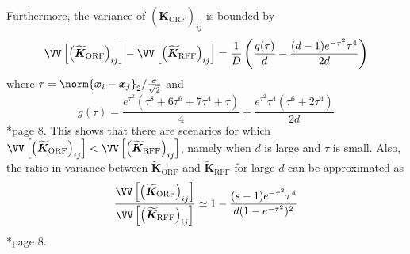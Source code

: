 Furthermore, the variance of $\left( \bm{\widetilde{K}}_{\text{ORF}} \right)_{ij}$ is bounded by
\[
    \VV \left[ \left( \bm{\widetilde{K}}_{\text{ORF}} \right)_{ij} \right] - \VV \left[ \left( \bm{\widetilde{K}}_{\text{RFF}} \right)_{ij} \right] = \frac{1}{D} \left( \frac{g (\tau)}{d} - \frac{(d-1)e^{-\tau^2}\tau^4}{2d} \right)
\]
where $\tau = \norm{\bm{x}_i - \bm{x}_j}_2 / \frac{\sigma}{\sqrt{2}}$ and
\[
    g (\tau) = \frac{e^{\tau^2} \left( \tau^8 + 6 \tau^6 + 7 \tau^4 + \tau \right)}{4} + \frac{e^{\tau^2} \tau^4 \left( \tau^6 + 2 \tau^4 \right)}{2d}
\]
\cite{LiuFanghui2021RFfK}*{page 8}. This shows that there are scenarios for which $\VV \left[ \left( \bm{\widetilde{K}}_{\text{ORF}} \right)_{ij} \right] < \VV \left[ \left( \bm{\widetilde{K}}_{\text{RFF}} \right)_{ij} \right]$, namely when $d$ is large and $\tau$ is small. Also, the ratio in variance between $\bm{\widetilde{K}}_{\text{ORF}}$ and $\bm{\widetilde{K}}_{\text{RFF}}$ for large $d$ can be approximated as
\[
    \frac{\VV \left[ \left( \bm{\widetilde{K}}_{\text{ORF}} \right)_{ij} \right]}{\VV \left[ \left( \bm{\widetilde{K}}_{\text{RFF}} \right)_{ij} \right]} \simeq 1 - \frac{(s-1)e^{-\tau^2}\tau^4}{d(1-e^{-\tau^2})^2}
\]
\cite{LiuFanghui2021RFfK}*{page 8}.